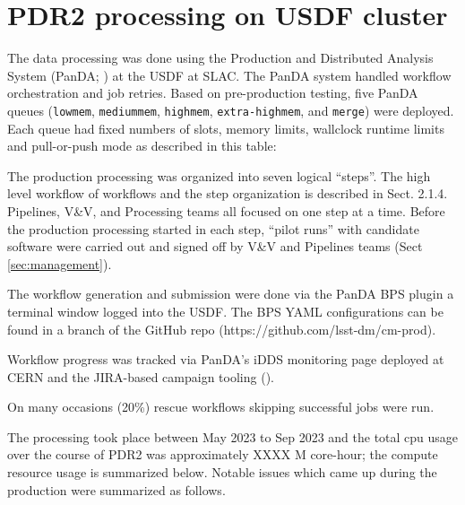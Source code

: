 \section{PDR2 processing on USDF cluster} \label{sec:processing}

The data processing was done using the Production and Distributed Analysis System (PanDA; ) at the USDF at SLAC.
The PanDA system handled workflow orchestration and job retries.
Based on pre-production testing, five PanDA queues (\texttt{lowmem}, \texttt{mediummem}, \texttt{highmem}, \texttt{extra-highmem}, and  \texttt{merge}) were deployed. Each queue had fixed numbers of slots, memory limits, wallclock runtime limits and pull-or-push mode as described in this table:

The production processing was organized into seven logical ``steps''.
The high level workflow of workflows and the step organization is described in  Sect. 2.1.4.
Pipelines, V\&V, and Processing teams all focused on one step at a time.
Before the production processing started in each step, ``pilot runs'' with candidate software were carried out and signed off by V\&V and Pipelines teams
(Sect \ref{sec:management}).

The workflow generation and submission were done via the PanDA BPS plugin a terminal window logged into the USDF.
The BPS YAML configurations can be found in a branch of the  GitHub repo (https://github.com/lsst-dm/cm-prod).

Workflow progress was tracked via PanDA's iDDS monitoring page deployed at CERN and the JIRA-based campaign tooling ().

On many occasions (20\%) rescue workflows skipping successful jobs were run.

The processing took place  between May 2023 to Sep 2023 and the total cpu usage over the course of PDR2 was approximately XXXX M core-hour; the compute resource usage is summarized below.
Notable issues which came up during the production were summarized as follows.

